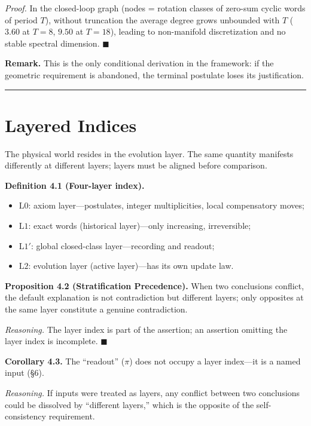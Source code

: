 \documentclass[
  11pt,
]{article}
\providecommand{\tightlist}{%
  \setlength{\itemsep}{0pt}\setlength{\parskip}{0pt}}
\begin{document}
\emph{Proof.} In the closed-loop graph (nodes = rotation classes of
zero-sum cyclic words of period \(T\)), without truncation the average
degree grows unbounded with \(T\) (\(3.60\) at \(T=8\), \(9.50\) at
\(T=18\)), leading to non-manifold discretization and no stable spectral
dimension. \(\blacksquare\)

\textbf{Remark.} This is the only conditional derivation in the
framework: if the geometric requirement is abandoned, the terminal
postulate loses its justification.

\begin{center}\rule{0.5\linewidth}{0.5pt}\end{center}

\section{Layered Indices}\label{layered-indices}

The physical world resides in the evolution layer. The same quantity
manifests differently at different layers; layers must be aligned before
comparison.

\textbf{Definition 4.1 (Four-layer index).}

\begin{itemize}
\tightlist
\item
  \(\mathrm{L0}\): axiom layer---postulates, integer multiplicities,
  local compensatory moves;
\item
  \(\mathrm{L1}\): exact words (historical layer)---only increasing,
  irreversible;
\item
  \(\mathrm{L1}'\): global closed-class layer---recording and readout;
\item
  \(\mathrm{L2}\): evolution layer (active layer)---has its own update
  law.
\end{itemize}

\textbf{Proposition 4.2 (Stratification Precedence).} When two
conclusions conflict, the default explanation is not contradiction but
different layers; only opposites at the same layer constitute a genuine
contradiction.

\emph{Reasoning.} The layer index is part of the assertion; an assertion
omitting the layer index is incomplete. \(\blacksquare\)

\textbf{Corollary 4.3.} The ``readout'' (\(\pi\)) does not occupy a
layer index---it is a named input (§6).

\emph{Reasoning.} If inputs were treated as layers, any conflict between
two conclusions could be dissolved by ``different layers,'' which is the
opposite of the self-consistency requirement.
\end{document}
